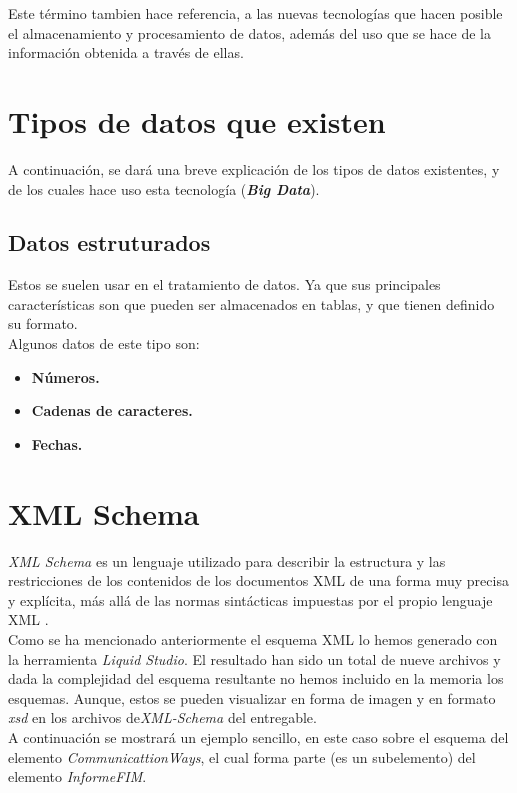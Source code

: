 \documentclass[11pt]{diazessay} %
\begin{document}
Este término tambien hace referencia, a las nuevas tecnologías que hacen posible el almacenamiento y procesamiento de datos, además del uso que se hace de la información obtenida a través de ellas.


\newpage
\section*{Tipos de datos que existen}
A continuación, se dará una breve explicación de los tipos de datos existentes, y de los cuales hace uso esta tecnología (\textbf{\textit{Big Data}}).\\

\subsection*{Datos estruturados}
Estos se suelen usar en el tratamiento de datos. Ya que sus principales características son que pueden ser almacenados en tablas, y que tienen definido su formato.\\
Algunos datos de este tipo son:

\begin{itemize}
	\item \textbf{Números.}
	\item \textbf{Cadenas de caracteres.}
	\item \textbf{Fechas.}
\end{itemize}

\newpage
\section*{XML Schema}
\textit{XML Schema} es un lenguaje utilizado para describir la estructura y las restricciones de los contenidos de los documentos XML de una forma muy precisa y explícita, más allá de las normas sintácticas impuestas por el propio lenguaje XML \cite{xml_schema}. \\

Como se ha mencionado anteriormente el esquema XML lo hemos generado con la herramienta \textit{Liquid Studio}. El resultado han sido un total de nueve archivos y dada la complejidad del esquema resultante no hemos incluido en la memoria los esquemas. Aunque, estos se pueden visualizar en forma de imagen y en formato \textit{xsd} en los archivos de\textit{XML-Schema} del entregable.\\

A continuación se mostrará un ejemplo sencillo, en este caso sobre el esquema del elemento \textit{CommunicattionWays}, el cual forma parte (es un subelemento) del elemento \textit{InformeFIM}.\\
\end{document}
